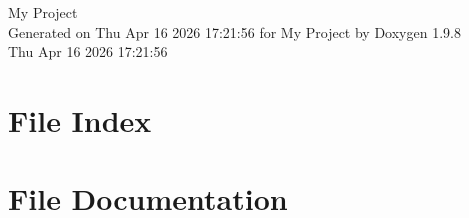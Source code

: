\documentclass[twoside]{book}
\newcommand{\+}{\discretionary{\mbox{\scriptsize$\hookleftarrow$}}{}{}}
\newcommand{\clearemptydoublepage}{%
    \newpage{\pagestyle{empty}\cleardoublepage}%
  }
\begin{document}
  \raggedbottom
    \hypersetup{pageanchor=false,
                bookmarksnumbered=true,
                pdfencoding=unicode
               }
  \begin{titlepage}
  \vspace*{7cm}
  \begin{center}%
  {\Large My Project}\\
  \vspace*{1cm}
  {\large Generated on Thu Apr 16 2026 17\+:21\+:56 for My Project by Doxygen 1.9.8}\\
    \vspace*{0.5cm}
    {\small Thu Apr 16 2026 17:21:56}
  \end{center}
  \end{titlepage}
  \clearemptydoublepage
  \tableofcontents
  \clearemptydoublepage
  \hypersetup{pageanchor=true}

\chapter{File Index}

\chapter{File Documentation}


  \backmatter
  \newpage
  \clearemptydoublepage
  \printindex
\end{document}
